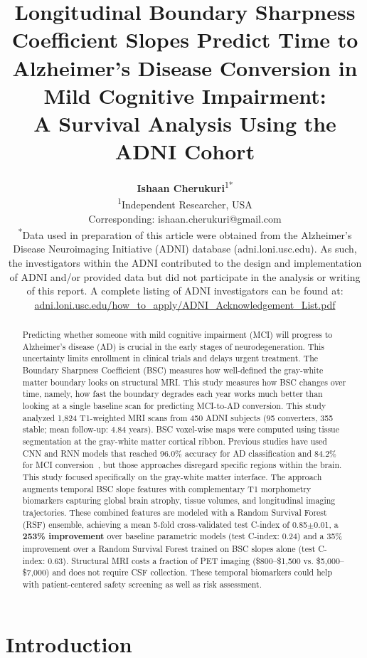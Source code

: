 \documentclass[blue]{ludusofficial}
\title{Longitudinal Boundary Sharpness Coefficient Slopes Predict Time to Alzheimer's Disease Conversion in Mild Cognitive Impairment:\\[8pt]A Survival Analysis Using the ADNI Cohort}
\author{
    \textbf{Ishaan Cherukuri}\textsuperscript{1}\textsuperscript{*}\\[0.2cm]
    \small\textsuperscript{1}Independent Researcher, USA\\
    \small Corresponding: ishaan.cherukuri@gmail.com\\[0.4cm]
    \small\textsuperscript{*}Data used in preparation of this article were obtained from the Alzheimer's Disease Neuroimaging Initiative (ADNI) database (adni.loni.usc.edu). As such, the investigators within the ADNI contributed to the design and implementation of ADNI and/or provided data but did not participate in the analysis or writing of this report. A complete listing of ADNI investigators can be found at: \href{http://adni.loni.usc.edu/wp-content/uploads/how_to_apply/ADNI_Acknowledgement_List.pdf}{adni.loni.usc.edu/how\_to\_apply/ADNI\_Acknowledgement\_List.pdf}
}
\begin{document}
\begin{abstract}
Predicting whether someone with mild cognitive impairment (MCI) will progress to Alzheimer's disease (AD) is crucial in the early stages of neurodegeneration. This uncertainty limits enrollment in clinical trials and delays urgent treatment. The Boundary Sharpness Coefficient (BSC)\cite{olafson2021bsc} measures how well-defined the gray-white matter boundary looks on structural MRI. This study measures how BSC changes over time, namely, how fast the boundary degrades each year works much better than looking at a single baseline scan for predicting MCI-to-AD conversion. This study analyzed 1,824 T1-weighted MRI scans from 450 ADNI subjects (95 converters, 355 stable; mean follow-up: 4.84 years). BSC voxel-wise maps were computed using tissue segmentation at the gray-white matter cortical ribbon. Previous studies have used CNN and RNN models that reached 96.0\% accuracy for AD classification and 84.2\% for MCI conversion~\cite{hafeez2024deep}, but those approaches disregard specific regions within the brain. This study focused specifically on the gray-white matter interface. The approach augments temporal BSC slope features with complementary T1 morphometry biomarkers capturing global brain atrophy, tissue volumes, and longitudinal imaging trajectories. These combined features are modeled with a Random Survival Forest (RSF) ensemble, achieving a mean 5-fold cross-validated test C-index of 0.85$\pm$0.01, a \textbf{253\% improvement} over baseline parametric models (test C-index: 0.24) and a 35\% improvement over a Random Survival Forest trained on BSC slopes alone (test C-index: 0.63). Structural MRI costs a fraction of PET imaging (\$800--\$1,500 vs. \$5,000--\$7,000) and does not require CSF collection. These temporal biomarkers could help with patient-centered safety screening as well as risk assessment.
\end{abstract}


\maketitle

\section{Introduction}
\end{document}

